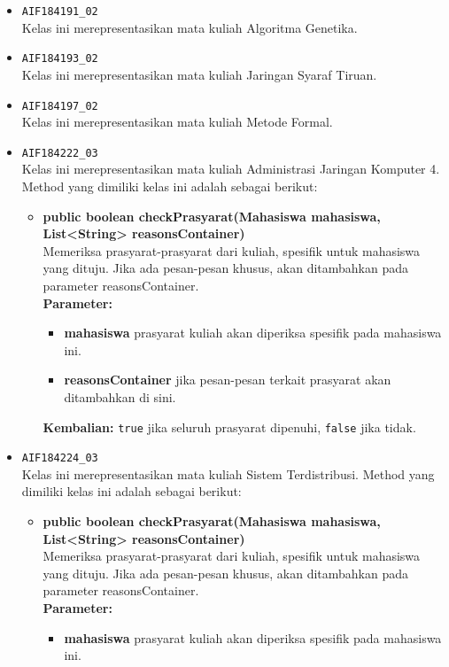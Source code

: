 \begin{enumerate}
\begin{itemize}
\begin{itemize}
		\end{itemize}
		\item \texttt{AIF184191\_02} \\
		Kelas ini merepresentasikan mata kuliah Algoritma Genetika.
		\item \texttt{AIF184193\_02} \\
		Kelas ini merepresentasikan mata kuliah Jaringan Syaraf Tiruan.
		\item \texttt{AIF184197\_02} \\
		Kelas ini merepresentasikan mata kuliah Metode Formal.
		\item \texttt{AIF184222\_03} \\
		Kelas ini merepresentasikan mata kuliah Administrasi Jaringan Komputer 4. Method yang dimiliki kelas ini adalah sebagai berikut: 
		\begin{itemize}
			\item \textbf{public boolean checkPrasyarat(Mahasiswa mahasiswa, List<String> reasonsContainer)}\\
			Memeriksa prasyarat-prasyarat dari kuliah, spesifik untuk mahasiswa yang dituju. Jika ada pesan-pesan khusus, akan ditambahkan pada parameter reasonsContainer.\\
			\textbf{Parameter:}
			\begin{itemize}
				\item \textbf{mahasiswa} prasyarat kuliah akan diperiksa spesifik pada mahasiswa ini.
				\item \textbf{reasonsContainer} jika pesan-pesan terkait prasyarat akan ditambahkan di sini.
			\end{itemize}
			\textbf{Kembalian:} \texttt{true} jika seluruh prasyarat dipenuhi, \texttt{false} jika tidak.
		\end{itemize}
		\item \texttt{AIF184224\_03} \\
		Kelas ini merepresentasikan mata kuliah Sistem Terdistribusi. Method yang dimiliki kelas ini adalah sebagai berikut: 
		\begin{itemize}
			\item \textbf{public boolean checkPrasyarat(Mahasiswa mahasiswa, List<String> reasonsContainer)}\\
			Memeriksa prasyarat-prasyarat dari kuliah, spesifik untuk mahasiswa yang dituju. Jika ada pesan-pesan khusus, akan ditambahkan pada parameter reasonsContainer.\\
			\textbf{Parameter:}
			\begin{itemize}
				\item \textbf{mahasiswa} prasyarat kuliah akan diperiksa spesifik pada mahasiswa ini.

\end{itemize}
\end{itemize}
\end{itemize}
\end{enumerate}

